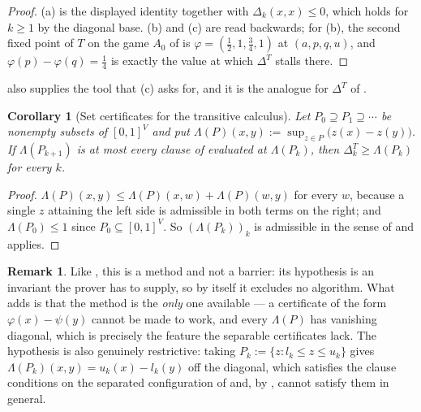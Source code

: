 \documentclass[11pt]{article}
\theoremstyle{plain}
\newtheorem{corollary}[theorem]{Corollary}
\theoremstyle{definition}
\newtheorem{remark}[theorem]{Remark}
\begin{document}
\begin{proof}
(a) is the displayed identity together with
$\Delta_k(x,x)\le0$, which holds for $k\ge1$ by the diagonal base. (b)
and (c) are  read backwards; for (b), the second
fixed point of $T$ on the game $A_0$ of  is
$\varphi=(\tfrac12,1,\tfrac34,1)$ at $(a,p,q,u)$, and
$\varphi(p)-\varphi(q)=\tfrac14$ is exactly the value at which
$\Delta^{T}$ stalls there.
\end{proof}

 also supplies the tool that
(c) asks for, and it is the analogue for
$\Delta^{T}$ of .

\begin{corollary}[Set certificates for the transitive
calculus]\label{cor:set-certificate}
Let $P_0\supseteq P_1\supseteq\cdots$ be nonempty subsets of $[0,1]^{V}$
and put $\Lambda(P)(x,y):=\sup_{z\in P}\bigl(z(x)-z(y)\bigr)$. If
$\Lambda(P_{k+1})$ is at most every clause of 
evaluated at $\Lambda(P_{k})$, then $\Delta^{T}_k\ge\Lambda(P_k)$ for
every $k$.
\end{corollary}

\begin{proof}
$\Lambda(P)(x,y)\le\Lambda(P)(x,w)+\Lambda(P)(w,y)$ for every $w$,
because a single $z$ attaining the left side is admissible in both terms
on the right; and $\Lambda(P_0)\le1$ since $P_0\subseteq[0,1]^{V}$. So
$(\Lambda(P_k))_k$ is admissible in the sense of 
and  applies.
\end{proof}

\begin{remark}\label{rem:set-certificate}
Like , this is a method and not a
barrier: its hypothesis is an invariant the prover has to supply, so by
itself it excludes no algorithm. What  adds is that
the method is the \emph{only} one available --- a certificate of the form
$\varphi(x)-\psi(y)$ cannot be made to work, and every $\Lambda(P)$ has
vanishing diagonal, which is precisely the feature the separable
certificates lack. The hypothesis is also genuinely restrictive: taking
$P_k:=\{z:l_k\le z\le u_k\}$ gives $\Lambda(P_k)(x,y)=u_k(x)-l_k(y)$
off the diagonal, which satisfies the clause conditions on the separated
configuration of  and, by
, cannot satisfy them in general.
\end{remark}
\end{document}
